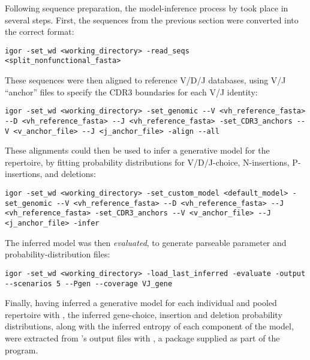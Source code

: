 
Following sequence preparation, the model-inference process by  took place in several steps. First, the sequences from the previous section were converted into the correct format:

\begin{lstlisting}
igor -set_wd <working_directory> -read_seqs <split_nonfunctional_fasta>
\end{lstlisting}

\noindent These sequences were then aligned to reference V/D/J databases, using V/J ``anchor'' files to specify the CDR3 boundaries for each V/J identity:

\begin{lstlisting}
igor -set_wd <working_directory> -set_genomic --V <vh_reference_fasta> --D <vh_reference_fasta> --J <vh_reference_fasta> -set_CDR3_anchors --V <v_anchor_file> --J <j_anchor_file> -align --all
\end{lstlisting}

\noindent These alignments could then be used to infer a generative model for the repertoire, by fitting probability distributions for V/D/J-choice, N-insertions, P-insertions, and deletions:

\begin{lstlisting}
igor -set_wd <working_directory> -set_custom_model <default_model> -set_genomic --V <vh_reference_fasta> --D <vh_reference_fasta> --J <vh_reference_fasta> -set_CDR3_anchors --V <v_anchor_file> --J <j_anchor_file> -infer
\end{lstlisting}

\noindent The inferred model was then \textit{evaluated}, to generate parseable parameter and probability-distribution files:

\begin{lstlisting}
igor -set_wd <working_directory> -load_last_inferred -evaluate -output --scenarios 5 --Pgen --coverage VJ_gene
\end{lstlisting}

\noindent Finally, having inferred a generative model for each individual and pooled repertoire with , the inferred gene-choice, insertion and deletion probability distributions, along with the inferred entropy of each component of the model, were extracted from 's output files with , a  package supplied as part of the  program.